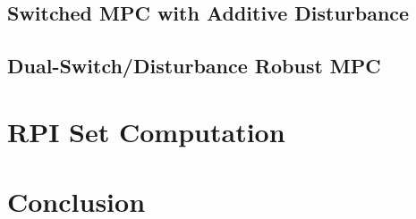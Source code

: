 \documentclass[letterpaper, 10 pt, conference]{ieeeconf}
\begin{document}
    \subsection{Switched MPC with Additive Disturbance}
        
    \subsection{Dual-Switch/Disturbance Robust MPC}
          
\section{RPI Set Computation}
    
\section{Conclusion}




\end{document}
